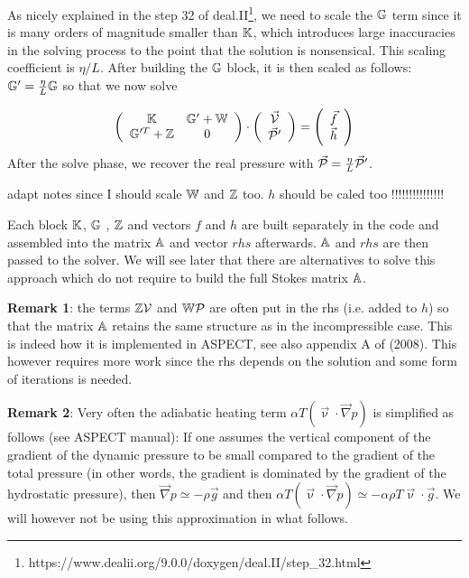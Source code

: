As nicely explained in the step 32 of 
deal.II\footnote{https://www.dealii.org/9.0.0/doxygen/deal.II/step\_32.html},
we need to scale the ${\mathbb{G}}$ term since it is many orders of magnitude smaller than ${\mathbb{K}}$, 
which introduces large inaccuracies in the solving process to the point that 
the solution is nonsensical. This scaling coefficient is $\eta/L$. After building 
the ${\mathbb{G}}$ block, it is then scaled as follows: ${\mathbb{G}}'=\frac{\eta}{L}{\mathbb{G}}$ so that we now solve 

\[
\left( \begin{array}{cc}
{\mathbb{K}} & {\mathbb{G}}'+{\mathbb{W}} \\ {\mathbb{G}}'^T+{\mathbb{Z}} & 0 
\end{array} \right)
\cdot
\left( \begin{array}{c}
\vec{\cal V} \\ \vec{\cal P}'
\end{array} \right)
=
\left( \begin{array}{c}
\vec{f} \\ \vec{h}
\end{array} \right)
\]
After the solve phase, we recover the real pressure with $\vec{\cal P}=\frac{\eta}{L} \vec{\cal P}'$.

{\color{red} adapt notes since I should scale ${\mathbb{W}}$ and ${\mathbb{Z}}$ too}.
{\color{red} $h$ should be caled too !!!!!!!!!!!!!!!} 

Each block ${\mathbb{K}}$, ${\mathbb{G}}$ , ${\mathbb{Z}}$ and vectors $f$ and $h$ are built separately 
in the code and assembled into 
the matrix ${\mathbb{A}}$ and vector $rhs$ afterwards. ${\mathbb{A}}$ and $rhs$ are then passed to the solver. 
We will see later that there are alternatives to solve this approach which do not require to 
build the full Stokes matrix ${\mathbb{A}}$. 

{\bf Remark 1}: the terms ${\mathbb{Z}} {\cal V}$ and ${\mathbb{W}} {\cal P}$ are 
often put in the rhs (i.e. added to $h$) so that 
the matrix ${\mathbb{A}}$ retains the same structure as in the incompressible case. This is indeed 
how it is implemented in ASPECT, see also appendix A of \textcite{lezh08} (2008). 
This however requires more work since the rhs depends 
on the solution and some form of iterations is needed. 

{\bf Remark 2}: Very often the adiabatic heating term  
$\alpha T \left( \vec\upnu  \cdot \vec\nabla p \right)$ is simplified as follows (see ASPECT manual):
If one assumes the vertical component of the gradient of the dynamic pressure to be small compared to the
gradient of the total pressure (in other words, the gradient is dominated by the gradient of the hydrostatic
pressure), then $\vec\nabla p \simeq -\rho \vec{g}$ and then 
$\alpha T \left( \vec\upnu \cdot \vec\nabla p \right) \simeq  
-\alpha\rho T \vec{\upnu}\cdot \vec{g}$. We will however not be using this approximation in what follows.

